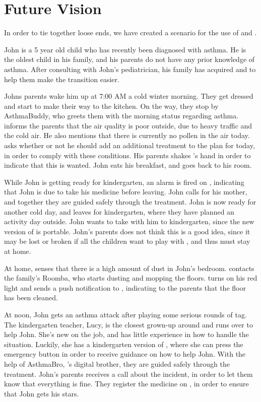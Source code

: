 \section{Future Vision}
\label{sec:futurevision}

In order to tie together loose ends, we have created a scenario for the use of \app{} and \buddy{}.

John is a 5 year old child who has recently been diagnosed with asthma. He is the oldest child in his family, and his parents do not have any prior knowledge of asthma. After consulting with John's pediatrician, his family has acquired \buddy{} and \app{} to help them make the transition easier. 

Johns parents wake him up at 7:00 AM a cold winter morning. They get dressed and start to make their way to the kitchen. On the way, they stop by AsthmaBuddy, who greets them with the morning status regarding asthma. \buddy{} informs the parents that the air quality is poor outside, due to heavy traffic and the cold air. He also mentions that there is currently no pollen in the air today. \buddy{} asks whether or not he should add an additional treatment to the plan for today, in order to comply with these conditions. His parents shakes \buddy{}'s hand in order to indicate that this is wanted. John eats his breakfast, and goes back to his room. 

While John is getting ready for kindergarten, an alarm is fired on \buddy{}, indicating that John is due to take his medicine before leaving. John calls for his mother, and together they are guided safely through the treatment. John is now ready for another cold day, and leaves for kindergarten, where they have planned an activity day outside. John wants to take \ab{} with him to kindergarten, since the new version of \ab{} is portable. John's parents does not think this is a good idea, since it may be lost or broken if all the children want to play with \ab{}, and thus \ab{} must stay at home.

At home, \buddy{} senses that there is a high amount of dust in John's bedroom. \buddy{} contacts the family's Roomba, who starts dusting and mopping the floors. \buddy{} turns on his red light and sends a push notification to \app{}, indicating to the parents that the floor has been cleaned. 

At noon, John gets an asthma attack after playing some serious rounds of tag. The kindergarten teacher, Lucy, is the closest grown-up around and runs over to help John. She's new on the job, and has little experience in how to handle the situation. Luckily, she has a kindergarten version of \app{}, where she can press the emergency button in order to receive guidance on how to help John. With the help of AsthmaBro, \buddy{}'s digital brother, they are guided safely through the treatment. John's parents receives a call about the incident, in order to let them know that everything is fine. They register the medicine on \app{}, in order to ensure that John gets his stars.

